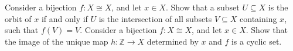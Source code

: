 \begin{foundational}
  \exercise Consider a bijection $f:X\cong X$, and let $x\in X$. Show that a subset $U\subseteq X$ is the orbit of $x$ if and only if $U$ is the intersection of all subsets $V\subseteq X$ containing $x$, such that $f(V)=V$.
  \exercise Consider a bijection $f:X\cong X$, and let $x\in X$. Show that the image of the unique map $h:\mathbb{Z}\to X$ determined by $x$ and $f$ is a cyclic set.
\end{foundational}



